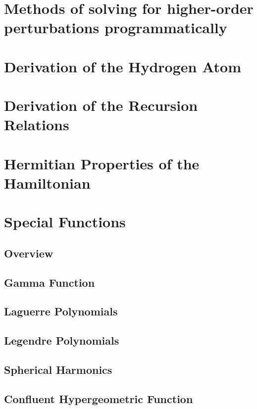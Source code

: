\chapter{Methods of solving for higher-order perturbations programmatically} \label{sec:Program_perturbation}
\chapter{Derivation of the Hydrogen Atom}
\chapter{Derivation of the Recursion Relations}
\chapter{Hermitian Properties of the Hamiltonian} \label{sec:Hermitian_Left}
\chapter{Special Functions}
    \section{Overview}
    \section{Gamma Function} \label{sec:Gamma_Function}
    \section{Laguerre Polynomials} \label{sec:Laguerre_Polynomial}
    \section{Legendre Polynomials} \label{sec:Legendre_Polynomial}
    \section{Spherical Harmonics}
    \section{Confluent Hypergeometric Function}